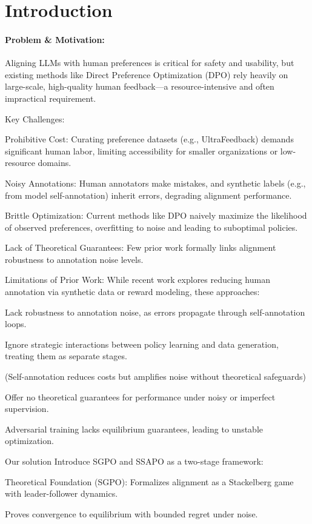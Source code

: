 \section{Introduction}
\paragraph{Problem \& Motivation:}
Aligning LLMs with human preferences is critical for safety and usability, but existing methods like Direct Preference Optimization (DPO) rely heavily on large-scale, high-quality human feedback—a resource-intensive and often impractical requirement.

Key Challenges:

Prohibitive Cost: Curating preference datasets (e.g., UltraFeedback) demands significant human labor, limiting accessibility for smaller organizations or low-resource domains.

Noisy Annotations: Human annotators make mistakes, and synthetic labels (e.g., from model self-annotation) inherit errors, degrading alignment performance.

Brittle Optimization: Current methods like DPO naively maximize the likelihood of observed preferences, overfitting to noise and leading to suboptimal policies.

Lack of Theoretical Guarantees: Few prior work formally links alignment robustness to annotation noise levels.

Limitations of Prior Work:
While recent work explores reducing human annotation via synthetic data or reward modeling, these approaches:

Lack robustness to annotation noise, as errors propagate through self-annotation loops.

Ignore strategic interactions between policy learning and data generation, treating them as separate stages.

(Self-annotation reduces costs but amplifies noise without theoretical safeguards)

Offer no theoretical guarantees for performance under noisy or imperfect supervision.

Adversarial training lacks equilibrium guarantees, leading to unstable optimization.

Our solution
Introduce SGPO and SSAPO as a two-stage framework:

Theoretical Foundation (SGPO):
Formalizes alignment as a Stackelberg game with leader-follower dynamics.

Proves convergence to equilibrium with bounded regret under noise.

